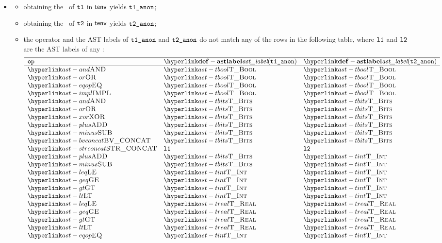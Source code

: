 \begin{itemize}
  \item {}
  \begin{itemize}
    \item obtaining the \underlyingtype\ of $\texttt{t1}$ in $\textsf{tenv}$ yields $\texttt{t1\_anon}$\ProseOrTypeError;
    \item obtaining the \underlyingtype\ of $\texttt{t2}$ in $\textsf{tenv}$ yields $\texttt{t2\_anon}$\ProseOrTypeError;
    \item the operator and the AST labels of $\texttt{t1\_anon}$ and $\texttt{t2\_anon}$ do not match any of the rows in the following table,
    where $\texttt{l1}$ and $\texttt{l2}$ are the AST labels of any \Prosesingulartypes{}:
    \[
    \begin{array}{lll}
      \hline
      \mathbf{\op} & \mathbf{\astlabel(\vtoneanon)} & \mathbf{\astlabel(\vttwoanon)} \\
      \hline
      \AND     & \TBool  & \TBool\\
      \OR      & \TBool  & \TBool\\
      \EQOP    & \TBool  & \TBool\\
      \IMPL    & \TBool  & \TBool\\
      \AND     & \TBits  & \TBits\\
      \OR      & \TBits  & \TBits\\
      \XOR     & \TBits  & \TBits\\
      \PLUS    & \TBits  & \TBits\\
      \MINUS   & \TBits  & \TBits\\
      \BVCONCAT& \TBits  & \TBits\\
      \STRCONCAT& \vlone  & \vltwo\\
      \PLUS    & \TBits  & \TInt\\
      \MINUS   & \TBits  & \TInt\\
      \LEQ     & \TInt     & \TInt\\
      \GEQ     & \TInt     & \TInt\\
      \GT      & \TInt     & \TInt\\
      \LT      & \TInt     & \TInt\\
      \LEQ     & \TReal    & \TReal\\
      \GEQ     & \TReal    & \TReal\\
      \GT      & \TReal    & \TReal\\
      \LT      & \TReal    & \TReal\\
      \EQOP    & \TInt     & \TInt\\

\end{array}\]
\end{itemize}
\end{itemize}
